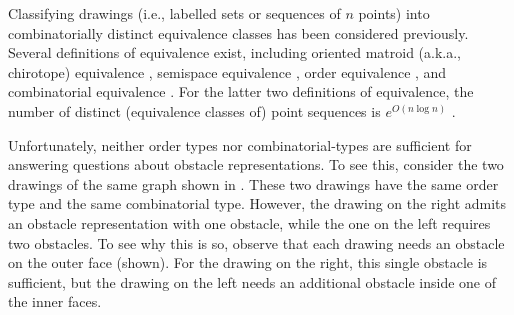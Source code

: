 \documentclass{patmorin}
\renewcommand{\note}[1]{}
\begin{document}
Classifying drawings (i.e., labelled sets or sequences of $n$
points) into combinatorially distinct equivalence classes has
been considered previously. Several definitions of equivalence
exist, including oriented matroid (a.k.a., chirotope) equivalence
\cite{bland.vergnas:orientability,folkman.lawrence:oriented}, semispace
equivalence \cite{goodman.pollack:semispaces}, order equivalence
\cite{goodman.pollack:multidimensional}, and combinatorial equivalence
\cite{goodman:on,goodman.pollack:semispaces}.  For the latter two
definitions of equivalence, the number of distinct (equivalence classes
of) point sequences is $e^{O(n\log n)}$ \cite{goodman.pollack:upper}.


Unfortunately, neither order types nor combinatorial-types are
sufficient for answering questions about obstacle representations.\note{Those other types don't have upper bounds on their numbers, so even if they're strong enough, we'd still have to prove upper bounds. It didn't look like those other types would work either but, to be honest, I didn't untangle the definitions enough to say so with certainty.}
To see this, consider the two drawings of the same graph shown in
.  These two drawings have the same order
type and the same combinatorial type. However, the drawing on the right
admits an obstacle representation with one obstacle, while the one on
the left requires two obstacles. To see why this is so, observe that each
drawing needs an obstacle on the outer face (shown). For the drawing
on the right, this single obstacle is sufficient, but the drawing
on the left needs an additional obstacle inside one of the inner faces.
\end{document}
